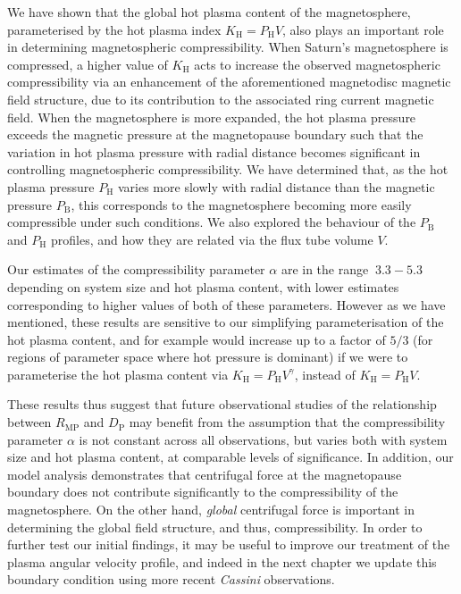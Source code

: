 We have shown that the global hot plasma content of the magnetosphere, parameterised by the hot plasma index $K_\mathrm{H}=P_\mathrm{H}V$, also plays an important role in determining magnetospheric compressibility. When Saturn's magnetosphere is compressed, a higher value of $K_\mathrm{H}$ acts to increase the observed magnetospheric compressibility via an enhancement of the aforementioned magnetodisc magnetic field structure, due to its contribution to the associated ring current magnetic field. When the magnetosphere is more expanded, the hot plasma pressure exceeds the magnetic pressure at the magnetopause boundary such that the variation in hot plasma pressure with radial distance becomes significant in controlling magnetospheric compressibility. We have determined that, as the hot plasma pressure $P_\mathrm{H}$ varies more slowly with radial distance than the magnetic pressure $P_\mathrm{B}$, this corresponds to the magnetosphere becoming more easily compressible under such conditions. We also explored the behaviour of the $P_\mathrm{B}$ and $P_\mathrm{H}$ profiles, and how they are related via the flux tube volume $V$. 

Our estimates of the compressibility parameter $\alpha$ are in the range ${~}3.3-5.3$ depending on system size and hot plasma content, with lower estimates corresponding to higher values of both of these parameters. However as we have mentioned, these results are sensitive to our simplifying parameterisation of the hot plasma content, and for example would increase up to a factor of $5/3$ (for regions of parameter space where hot pressure is dominant) if we were to parameterise the hot plasma content via $K_\mathrm{H} = P_\mathrm{H}V^\gamma$, instead of $K_\mathrm{H} = P_\mathrm{H}V$. 

These results thus suggest that future observational studies of the relationship between $R_\mathrm{MP}$ and $D_\mathrm{P}$ may benefit from the assumption that the compressibility parameter $\alpha$ is not constant across all observations, but varies both with system size and hot plasma content, at comparable levels of significance. In addition, our model analysis demonstrates that centrifugal force at the magnetopause boundary does not contribute significantly to the compressibility of the magnetosphere. On the other hand, \textit{global} centrifugal force is important in determining the global field structure, and thus, compressibility. In order to further test our initial findings, it may be useful to improve our treatment of the plasma angular velocity profile, and indeed in the next chapter we update this boundary condition using more recent \textit{Cassini} observations.

